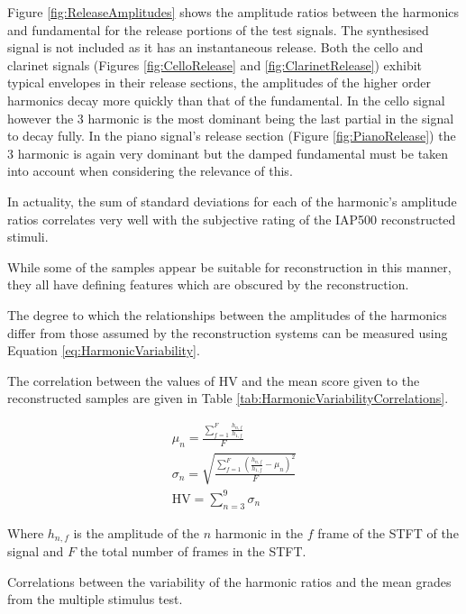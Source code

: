 		Figure \ref{fig:ReleaseAmplitudes} shows the amplitude ratios between the harmonics and fundamental for the
		release portions of the test signals. The synthesised signal is not included as it has an instantaneous
		release. Both the cello and clarinet signals (Figures \ref{fig:CelloRelease} and \ref{fig:ClarinetRelease})
		exhibit typical envelopes in their release sections, the amplitudes of the higher order harmonics decay
		more quickly than that of the fundamental. In the cello signal however the 3 harmonic is the most
		dominant being the last partial in the signal to decay fully. In the piano signal's release section (Figure
		\ref{fig:PianoRelease}) the 3 harmonic is again very dominant but the damped fundamental must be
		taken into account when considering the relevance of this.

		\note
		{
			In actuality, the sum of standard deviations for each of the harmonic's amplitude ratios correlates
			very well with the subjective rating of the IAP500 reconstructed stimuli.
			
			While some of the samples appear be suitable for reconstruction in this manner, they all have
			defining features which are obscured by the reconstruction.

			The degree to which the relationships between the amplitudes of the harmonics differ from those
			assumed by the reconstruction systems can be measured using Equation \ref{eq:HarmonicVariability}.

			The correlation between the values of $\textrm{HV}$ and the mean score given to the reconstructed
			samples are given in Table \ref{tab:HarmonicVariabilityCorrelations}.
		}

		\begin{gather}
			\mu_{n} = \frac{\sum_{f = 1}^{F} \frac{h_{n,f}}{h_{1,f}}}{F} \nonumber \\
			\sigma_{n} = \sqrt{\frac{\sum_{f = 1}^{F} 
					         \left(\frac{h_{n,f}}{h_{1,f}} - \mu_{n} \right)^{2}}{F}} \nonumber \\
			\textrm{HV} = \sum_{n = 3}^{9} \sigma_{n}
			\label{eq:HarmonicVariability}
		\end{gather}

		Where $h_{n,f}$ is the amplitude of the $n$ harmonic in the $f$ frame of the STFT of
		the signal and $F$ the total number of frames in the STFT.

		\begin{table}[h!]
			\centering
			
			\caption{Correlations between the variability of the harmonic ratios and 
				 the mean grades from the multiple stimulus test.}
			\label{tab:HarmonicVariabilityCorrelations}
		\end{table}

